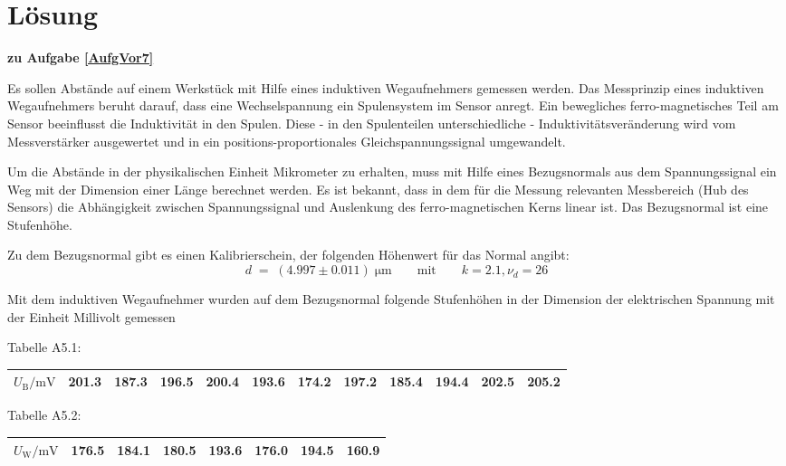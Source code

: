 \section{Lösung}
\textbf{zu Aufgabe \ref{AufgVor7}}

Es sollen Abstände auf einem Werkstück mit Hilfe eines induktiven Wegaufnehmers gemessen werden.
Das Messprinzip eines induktiven Wegaufnehmers beruht darauf, dass
eine Wechselspannung ein Spulensystem im Sensor anregt.
Ein bewegliches ferro-magnetisches Teil am Sensor
beeinflusst die Induktivität in den Spulen.
Diese - in den Spulenteilen unterschiedliche - Induktivitätsveränderung wird vom
Messverstärker ausgewertet und in ein positions-proportionales Gleichspannungssignal
umgewandelt.

Um die Abstände in der physikalischen Einheit Mikrometer zu erhalten, muss mit Hilfe
eines Bezugsnormals aus dem Spannungssignal ein Weg mit der Dimension einer Länge
berechnet werden.
Es ist bekannt, dass in dem für die Messung relevanten Messbereich (Hub des Sensors)
die Abhängigkeit zwischen Spannungssignal und Auslenkung des ferro-magnetischen Kerns
linear ist.
Das Bezugsnormal ist eine Stufenhöhe.

Zu dem Bezugsnormal gibt es einen Kalibrierschein, der folgenden Höhenwert für das
Normal angibt:
\begin{equation}
d \; = \; (4.997 \pm 0.011) \; \mathrm{\mu m} \qquad \mathrm{mit} \qquad k = 2.1, \nu_d = 26
\label{eq:kalBezug}
\end{equation}

Mit dem induktiven Wegaufnehmer wurden auf dem Bezugsnormal folgende Stufenhöhen in
der Dimension der elektrischen Spannung mit der Einheit Millivolt gemessen

Tabelle A5.1:\\
\begin{tabular}{c||c|c|c|c|c|c|c|c|c|c|c}
\hline
$U_\mathrm{B} / \mathrm{mV}$ & 201.3 & 187.3 & 196.5 & 200.4 & 193.6 & 174.2 & 197.2 & 185.4 & 194.4 & 202.5 & 205.2\\
\hline
\end{tabular}

Tabelle A5.2:\\
\begin{tabular}{c||c|c|c|c|c|c|c}
\hline
$U_\mathrm{W} / \mathrm{mV}$ & 176.5 & 184.1 & 180.5 & 193.6 & 176.0 & 194.5 & 160.9 \\
\hline
\end{tabular}

